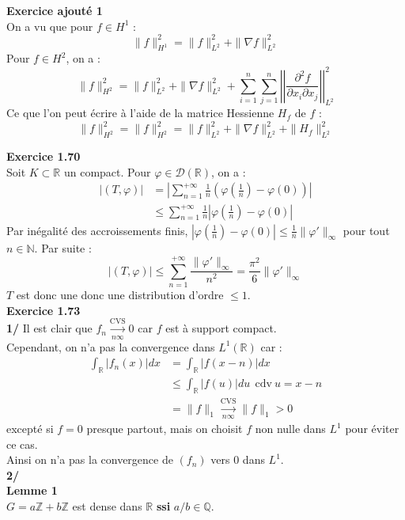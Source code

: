 \documentclass[a4paper,12pt]{article}
\begin{document}
\textbf{Exercice ajouté 1} \\
On a vu que pour $f \in H^1$ :
$$\boxed{\|f\|_{H^1}^2 = \|f\|^2_{L^2} + \| \nabla f \|_{L^2}^2}$$
Pour $f \in H^2$, on a :
$$\boxed{\|f\|_{H^2}^2 = \|f\|^2_{L^2} + \| \nabla f \|_{L^2}^2 + \sum_{i=1}^n \sum_{j=1}^n \left|\left| \frac{\partial^2 f}{\partial x_i \partial x_j} \right|\right|^2_{L^2}}$$
Ce que l'on peut écrire à l'aide de la matrice Hessienne $H_f$ de $f$ :
$$\boxed{\|f\|_{H^2}^2=\|f\|_{H^2}^2 = \|f\|^2_{L^2} + \| \nabla f \|_{L^2}^2 + \|H_f\|^2_{L^2}}$$

\textbf{Exercice 1.70} \\
Soit $K \subset \mathbb{R}$ un compact. Pour $\varphi \in \mathcal{D}(\mathbb{R})$, on a :
\begin{align*}
	|(T, \varphi)| & = |\sum_{n=1}^{+ \infty} \frac{1}{n} (\varphi(\frac{1}{n}) - \varphi(0))| \\
	& \leq \sum_{n=1}^{+ \infty} \frac{1}{n} | \varphi(\frac{1}{n}) - \varphi(0)|
\end{align*}
Par inégalité des accroissements finis, $|\varphi(\frac{1}{n}) - \varphi(0)| \leq  \frac{1}{n} \| \varphi ' \|_{\infty}$ pour tout $n \in \mathbb{N}$. Par suite :
$$|(T, \varphi)| \leq \sum_{n=1}^{+ \infty} \frac{\| \varphi '\|_{\infty}}{n^2} = \frac{\pi^2}{6} \| \varphi ' \|_{\infty}$$
$T$ est donc une donc une distribution d'ordre $ \leq 1$. \\

\textbf{Exercice 1.73} \\ 
\textbf{1/} Il est clair que $f_n \xrightarrow[n \infty]{\text{CVS}} 0$ car $f$ est à support compact. \\

Cependant, on n'a pas la convergence dans $L^1(\mathbb{R})$ car :
\begin{align*}
\int_{\mathbb{R}} |f_n(x)| dx & = \int_{\mathbb{R}} |f(x-n)|dx \\
	& \leq \int_{\mathbb{R}} |f(u)| du \ \ \text{cdv} \ u=x-n \\
	& = \| f \|_{1} \xrightarrow[n \infty]{\text{CVS}} \|f\|_1 > 0 
\end{align*}
excepté si $f=0$ presque partout, mais on choisit $f$ non nulle dans $L^1$ pour éviter ce cas. \\
Ainsi on n'a pas la convergence de $(f_n)$ vers $0$ dans $L^1$. \\

\textbf{2/} \\
\textbf{Lemme 1} \\
$G = a \mathbb{Z} + b \mathbb{Z}$ est dense dans $\mathbb{R}$ \textbf{ssi} $a/b \in \mathbb{Q}$. \\
\end{document}
